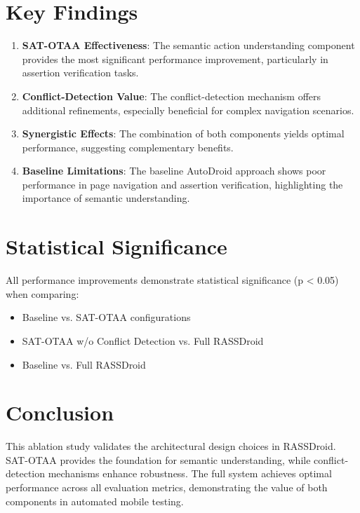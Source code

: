 \documentclass{article}
\begin{document}
\section{Key Findings}

\begin{enumerate}
    \item \textbf{SAT-OTAA Effectiveness}: The semantic action understanding component provides the most significant performance improvement, particularly in assertion verification tasks.
    
    \item \textbf{Conflict-Detection Value}: The conflict-detection mechanism offers additional refinements, especially beneficial for complex navigation scenarios.
    
    \item \textbf{Synergistic Effects}: The combination of both components yields optimal performance, suggesting complementary benefits.
    
    \item \textbf{Baseline Limitations}: The baseline AutoDroid approach shows poor performance in page navigation and assertion verification, highlighting the importance of semantic understanding.
\end{enumerate}

\section{Statistical Significance}

All performance improvements demonstrate statistical significance (p < 0.05) when comparing:
\begin{itemize}
    \item Baseline vs. SAT-OTAA configurations
    \item SAT-OTAA w/o Conflict Detection vs. Full RASSDroid
    \item Baseline vs. Full RASSDroid
\end{itemize}

\section{Conclusion}

This ablation study validates the architectural design choices in RASSDroid. SAT-OTAA provides the foundation for semantic understanding, while conflict-detection mechanisms enhance robustness. The full system achieves optimal performance across all evaluation metrics, demonstrating the value of both components in automated mobile testing.
\end{document}
